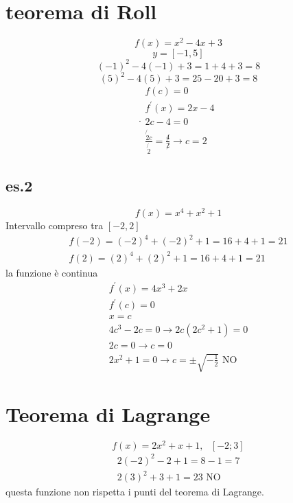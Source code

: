 \documentclass{article}
\begin{document}
\section{teorema di Roll}
		\begin{equation*}
			f(x)=x^2-4x+3
		\end{equation*}
	\begin{equation*}
		y=[-1,5]
	\end{equation*}
		\begin{equation*}
			(-1)^2-4(-1)+3=1+4+3=8
		\end{equation*}
		\begin{equation*}
			(5)^2-4(5)+3=25-20+3=8
		\end{equation*}
		\begin{equation}
	.		\begin{matrix}
				f(c)=0\\
				f^\prime(x)=2x-4\\
				2c-4=0\\
				\frac{\not{2}c}{\not{2}}=\frac{\not4}{\not2}\to c=2
			\end{matrix}
		\end{equation}
		\subsection{es.2}
		\begin{equation*}
			f(x)=x^4+x^2+1
		\end{equation*}
		Intervallo compreso tra $[-2,2]$
		\begin{equation*}
			\begin{matrix}
				f(-2)=(-2)^4+(-2)^2+1=16+4+1=21\\
				f(2)=(2)^4+(2)^2+1=16+4+1=21
			\end{matrix}
		\end{equation*}
		la funzione è continua
		\begin{equation*}
			\begin{matrix}
				f^\prime(x)=4x^3+2x\\
				f^\prime(c)=0\\
				x=c\\
				4c^3-2c=0 \to 2c(2c^2+1)=0\\
				2c=0\to c=0\\
				2x^2+1=0\to c=\pm\sqrt{-\frac{1}{2}} \text{ NO}
			\end{matrix}
		\end{equation*}
	\section{Teorema di Lagrange}
	\begin{equation*}
		f(x)=2x^2+x+1, \text{ } [-2;3]
	\end{equation*}
	\begin{equation*}
		\begin{matrix}
			2(-2)^2-2+1=8-1=7\\
			2(3)^2+3+1=23 \text{ NO}
		\end{matrix}
	\end{equation*}
questa funzione non rispetta i punti del teorema di Lagrange.
\end{document}

